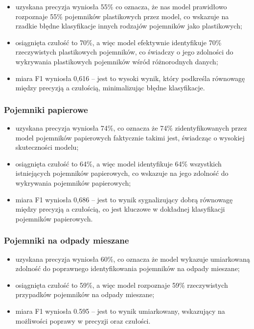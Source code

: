 \documentclass[12pt, a4paper, twoside, openany]{book}
\begin{document}
\begin{itemize}[label=--]
    \item uzyskana precyzja wyniosła 55\% co oznacza, że nas model prawidłowo rozpoznaje 55\% pojemników plastikowych przez model, co wskazuje na rzadkie błędne klasyfikacje innych rodzajów pojemników jako plastikowych;
    \item osiągnięta czułość to 70\%, a więc model efektywnie identyfikuje 70\% rzeczywistych plastikowych pojemników, co świadczy o jego zdolności do wykrywania plastikowych pojemników wśród różnorodnych danych;
    \item miara F1 wyniosła 0,616 -- jest to wysoki wynik, który podkreśla równowagę między precyzją a czułością, minimalizując błędne klasyfikacje.
\end{itemize}

\subsubsection{Pojemniki papierowe}

\begin{itemize}[label=--]
    \item uzyskana precyzja wyniosła 74\%, co oznacza że 74\% zidentyfikowanych przez model pojemników papierowych faktycznie takimi jest, świadcząc o wysokiej skuteczności modelu;
    \item osiągnięta czułość to 64\%, a więc model identyfikuje 64\% wszystkich istniejących pojemników papierowych, co wskazuje na jego zdolność do wykrywania pojemników papierowych;
    \item miara F1 wyniosła 0,686 -- jest to wynik sygnalizujący dobrą równowagę między precyzją a czułością, co jest kluczowe w dokładnej klasyfikacji pojemników papierowych.
\end{itemize}

\subsubsection{Pojemniki na odpady mieszane}

\begin{itemize}[label=--]
    \item uzyskana precyzja wyniosła 60\%, co oznacza że model wykazuje umiarkowaną zdolność do poprawnego identyfikowania pojemników na odpady mieszane;
    \item osiągnięta czułość to 59\%, a więc model rozpoznaje 59\% rzeczywistych przypadków pojemników na odpady mieszane;
    \item miara F1 wyniosła 0.595 -- jest to wynik umiarkowany, wskazujący na możliwości poprawy w precyzji oraz czułości.
\end{itemize}
\end{document}
